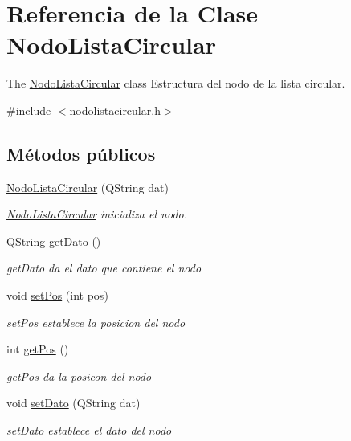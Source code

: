 \hypertarget{class_nodo_lista_circular}{}\section{Referencia de la Clase Nodo\+Lista\+Circular}
\label{class_nodo_lista_circular}


The \mbox{\hyperlink{class_nodo_lista_circular}{Nodo\+Lista\+Circular}} class Estructura del nodo de la lista circular.  




{\ttfamily \#include $<$nodolistacircular.\+h$>$}

\subsection*{Métodos públicos}
\begin{DoxyCompactItemize}
\item 
\mbox{\hyperlink{class_nodo_lista_circular_a545fa0b7acf627390514fe87b6aff277}{Nodo\+Lista\+Circular}} (Q\+String dat)
\begin{DoxyCompactList}\small\item\em \mbox{\hyperlink{class_nodo_lista_circular}{Nodo\+Lista\+Circular}} inicializa el nodo. \end{DoxyCompactList}\item 
Q\+String \mbox{\hyperlink{class_nodo_lista_circular_a37393a1f2c117891206678387d2a9837}{get\+Dato}} ()
\begin{DoxyCompactList}\small\item\em get\+Dato da el dato que contiene el nodo \end{DoxyCompactList}\item 
void \mbox{\hyperlink{class_nodo_lista_circular_aa6307fda1bf33f2d8035893ee9fea81a}{set\+Pos}} (int pos)
\begin{DoxyCompactList}\small\item\em set\+Pos establece la posicion del nodo \end{DoxyCompactList}\item 
int \mbox{\hyperlink{class_nodo_lista_circular_a5e835714bbc78795e50e6c76a3157ff4}{get\+Pos}} ()
\begin{DoxyCompactList}\small\item\em get\+Pos da la posicon del nodo \end{DoxyCompactList}\item 
void \mbox{\hyperlink{class_nodo_lista_circular_a3f2bd335e477f76dfcb2417686ca6296}{set\+Dato}} (Q\+String dat)
\begin{DoxyCompactList}\small\item\em set\+Dato establece el dato del nodo \end{DoxyCompactList}\end{DoxyCompactItemize}
